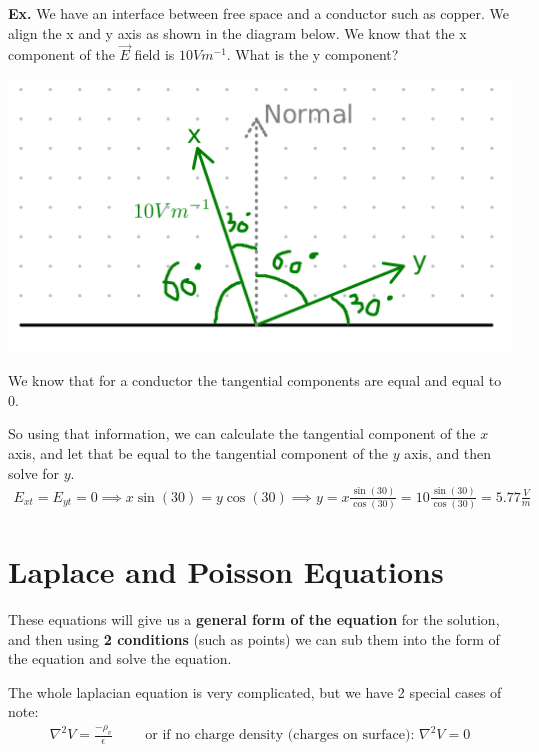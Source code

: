 \documentclass[12pt,letterpaper]{article} \usepackage{amsmath} \usepackage{graphicx} \usepackage[margin=1in]{geometry} \usepackage{longtable}  \usepackage{amssymb}
\begin{document}
	\begin{mdframed}
		\textbf{Ex. }We have an interface between free space and a conductor such as copper. We align the x and y axis as shown in the diagram below. We know that the x component of the $\vec E$ field is $10 Vm^{-1}$. What is the y component?
		\begin{center}
			\includegraphics[width=0.5\linewidth]{boundary-conditions-ex}
		\end{center}
		We know that for a conductor the tangential components are equal and equal to 0. 
		
		So using that information, we can calculate the tangential component of the $x$ axis, and let that be equal to the tangential component of the $y$ axis, and then solve for $y$. 
		\begin{align*}
			E_{xt} = E_{yt} = 0 \implies x\sin (30) = y\cos (30) \implies y = x\frac{\sin(30)}{\cos(30)}= 10\frac{\sin(30)}{\cos(30)} = 5.77 \frac{V}{m}
		\end{align*}
	\end{mdframed}

	\section{Laplace and Poisson Equations}
	These equations will give us a \textbf{general form of the equation} for the solution, and then using \textbf{2 conditions} (such as points) we can sub them into the form of the equation and solve the equation. 
	
	The whole laplacian equation is very complicated, but we have 2 special cases of note:
	\begin{align*}
		\nabla^2 V = \frac{-\rho_v}{\epsilon} \qquad \text{ or if no charge density (charges on surface): } \nabla^2V=0
	\end{align*}
\end{document}
